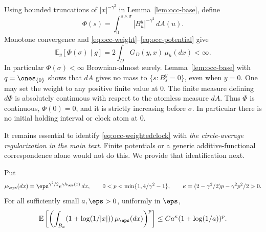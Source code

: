 Using bounded truncations of $|x|^{-\gamma^2}$ in Lemma~\ref{lem:occ-base},
define
\begin{equation}\label{eq:occ-weightedclock}
 \Phi(s)=\int_0^{s\wedge\sigma}|B^y_u|^{-\gamma^2}\,dA(u).
\end{equation}
Monotone convergence and \eqref{eq:occ-weight}--\eqref{eq:occ-potential} give
\begin{equation}\label{eq:occ-weightedmean}
 \mathbb{E}_y[\Phi(\sigma)\mid g]
       =2\int_DG_D(y,x)\,\mu_h(dx)<\infty .
\end{equation}
In particular $\Phi(\sigma)<\infty$ Brownian-almost surely.
Lemma~\ref{lem:occ-base} with $q=\ones_{\{0\}}$ shows that
$dA$ gives no mass to $\{s:B^y_s=0\}$, even when $y=0$.
One may set the weight to any positive finite value at $0$.
The finite measure defining $d\Phi$ is absolutely continuous with
respect to the atomless measure $dA$. Thus $\Phi$ is continuous,
$\Phi(0)=0$, and it is strictly increasing before $\sigma$.
In particular there is no initial holding interval or clock atom at $0$.

It remains essential to identify \eqref{eq:occ-weightedclock} with
\emph{the circle-average regularization in the main text}. Finite potentials
or a generic additive-functional correspondence alone would not do this.
We provide that identification next.

\begin{lemma}\label{lem:occ-tails}
Put
\[
 \mu_\eps(dx)=\eps^{\gamma^2/2}e^{\gamma h_\eps(x)}\,dx,\qquad
 0<p<\min\{1,4/\gamma^2-1\},\qquad
 \kappa=(2-\gamma^2/2)p-\gamma^2p^2/2>0 .
\]
For all sufficiently small $a,\eps>0$, uniformly in $\eps$,
\begin{equation}\label{eq:occ-tail}
 \mathbb{E}\left[\left(\int_{B_a}
          (1+\log(1/|x|))\,\mu_\eps(dx)\right)^p\right]
     \leq C a^\kappa(1+\log(1/a))^p .
\end{equation}
\end{lemma}

